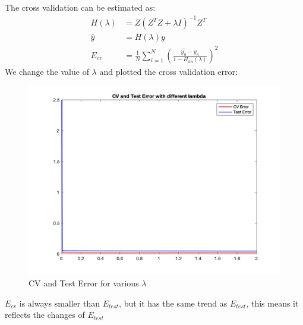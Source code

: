 \documentclass[12pt]{article}
\begin{document}
 \\\\
\indent The cross validation can be estimated as:
\begin{align*} \displaystyle
H(\lambda) &= Z(Z^TZ + \lambda I)^{-1}Z^T \\
\hat{y} &= H(\lambda)y \\
E_{cv} &= \frac{1}{N}\sum_{i = 1}^{N}(\frac{\hat{y_n} - y_n}{1 - H_{nn}(\lambda)})^2
\end{align*}
We change the value of $\lambda$ and plotted the cross validation error:
\begin{figure}[H]
  \centering
  \includegraphics[scale = 0.25]{4.jpg}
  \caption{CV and Test Error for various $\lambda$}
  \label{fig:4}
\end{figure}
\indent $E_{cv}$ is always smaller than $E_{test}$, but it has the same trend as $E_{test}$, this means it reflects the changes of $E_{test}$\\
\end{document}
